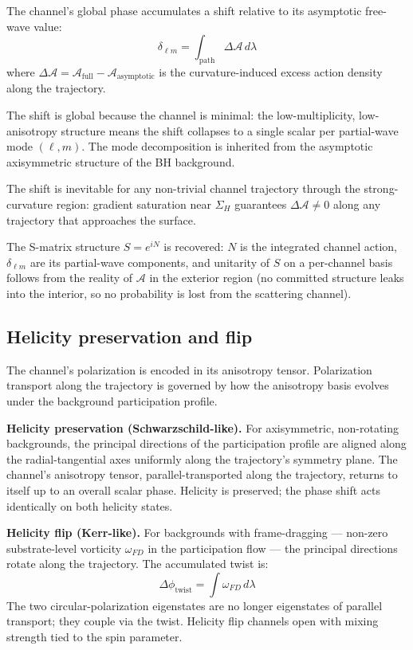 \documentclass[11pt,a4paper]{article}
\begin{document}
The channel's global phase accumulates a shift relative to its asymptotic free-wave value:
\[
\delta_{\ell m} = \int_{\mathrm{path}} \Delta\mathcal{A}\, d\lambda
\]
where $\Delta\mathcal{A} = \mathcal{A}_{\mathrm{full}} - \mathcal{A}_{\mathrm{asymptotic}}$ is the curvature-induced excess action density along the trajectory.

The shift is global because the channel is minimal: the low-multiplicity, low-anisotropy structure means the shift collapses to a single scalar per partial-wave mode $(\ell, m)$. The mode decomposition is inherited from the asymptotic axisymmetric structure of the BH background.

The shift is inevitable for any non-trivial channel trajectory through the strong-curvature region: gradient saturation near $\Sigma_H$ guarantees $\Delta\mathcal{A} \neq 0$ along any trajectory that approaches the surface.

The S-matrix structure $S = e^{iN}$ is recovered: $N$ is the integrated channel action, $\delta_{\ell m}$ are its partial-wave components, and unitarity of $S$ on a per-channel basis follows from the reality of $\mathcal{A}$ in the exterior region (no committed structure leaks into the interior, so no probability is lost from the scattering channel).

\subsection{Helicity preservation and flip}

The channel's polarization is encoded in its anisotropy tensor. Polarization transport along the trajectory is governed by how the anisotropy basis evolves under the background participation profile.

\textbf{Helicity preservation (Schwarzschild-like).} For axisymmetric, non-rotating backgrounds, the principal directions of the participation profile are aligned along the radial-tangential axes uniformly along the trajectory's symmetry plane. The channel's anisotropy tensor, parallel-transported along the trajectory, returns to itself up to an overall scalar phase. Helicity is preserved; the phase shift acts identically on both helicity states.

\textbf{Helicity flip (Kerr-like).} For backgrounds with frame-dragging --- non-zero substrate-level vorticity $\omega_{FD}$ in the participation flow --- the principal directions rotate along the trajectory. The accumulated twist is:
\[
\Delta\phi_{\mathrm{twist}} = \int \omega_{FD}\, d\lambda
\]
The two circular-polarization eigenstates are no longer eigenstates of parallel transport; they couple via the twist. Helicity flip channels open with mixing strength tied to the spin parameter.
\end{document}
